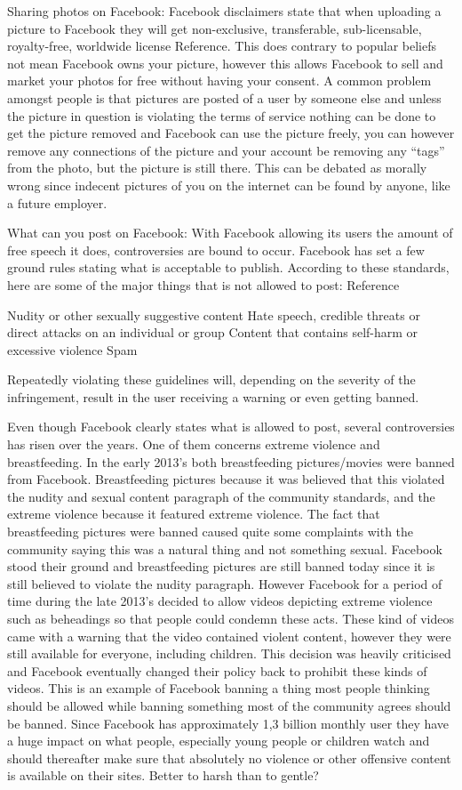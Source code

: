 \documentclass[conference]{IEEEtran}
\begin{document}
Sharing photos on Facebook: Facebook disclaimers state that when uploading a
picture to Facebook they will get non-exclusive, transferable, sub-licensable,
royalty-free, worldwide license Reference. This does contrary to popular
beliefs not mean Facebook owns your picture, however this allows Facebook to
sell and market your photos for free without having your consent. A common
problem amongst people is that pictures are posted of a user by someone else
and unless the picture in question is violating the terms of service nothing
can be done to get the picture removed and Facebook can use the picture freely,
you can however remove any connections of the picture and your account be
removing any “tags” from the photo, but the picture is still there. This can be
debated as morally wrong since indecent pictures of you on the internet can be
found by anyone, like a future employer.

What can you post on Facebook: With Facebook allowing its users the amount of
free speech it does, controversies are bound to occur. Facebook has set a few
ground rules stating what is acceptable to publish. According to these
standards, here are some of the major things that is not allowed to post:
Reference
 
Nudity or other sexually suggestive content Hate speech, credible threats or
direct attacks on an individual or group Content that contains self-harm or
excessive violence Spam


Repeatedly violating these guidelines will, depending on the severity of the
infringement, result in the user receiving a warning or even getting banned. 

Even though Facebook clearly states what is allowed to post, several
controversies has risen over the years. One of them concerns extreme violence
and breastfeeding.  In the early 2013’s both breastfeeding pictures/movies were
banned from Facebook. Breastfeeding pictures because it was believed that this
violated the nudity and sexual content paragraph of the community standards,
and the extreme violence because it featured extreme violence. The fact that
breastfeeding pictures were banned caused quite some complaints with the
community saying this was a natural thing and not something sexual. Facebook
stood their ground and breastfeeding pictures are still banned today since it
is still believed to violate the nudity paragraph. However Facebook for a
period of time during the late 2013’s decided to allow videos depicting extreme
violence such as beheadings so that people could condemn these acts. These kind
of videos came with a warning that the video contained violent content, however
they were still available for everyone, including children. This decision was
heavily criticised and Facebook eventually changed their policy back to
prohibit these kinds of videos.  This is an example of Facebook banning a thing
most people thinking should be allowed while banning something most of the
community agrees should be banned. Since Facebook has approximately 1,3 billion
monthly user they have a huge impact on what people, especially young people or
children watch and should thereafter make sure that absolutely no violence or
other offensive content is available on their sites. Better to harsh than to
gentle?
\end{document}
